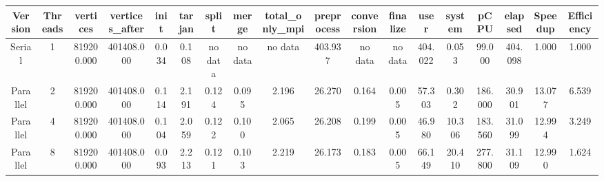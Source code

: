 \begin{tabular}{|c|c|c|c|c|c|c|c|c|c|c|c|c|c|c|c|c|c|}
\toprule
 Version &  Threads &   vertices &  vertices\_after &  init &  tarjan &   split &   merge & total\_only\_mpi &  preprocess & conversion & finalize &    user &  system &    pCPU &  elapsed &  Speedup &  Efficiency \\
\midrule
  Serial &        1 & 819200.000 &      401408.000 & 0.034 &   0.108 & no data & no data &        no data &     403.937 &    no data &  no data & 404.022 &   0.053 &  99.000 &  404.098 &    1.000 &       1.000 \\
Parallel &        2 & 819200.000 &      401408.000 & 0.114 &   2.191 &   0.124 &   0.095 &          2.196 &      26.270 &      0.164 &    0.005 &  57.303 &   0.302 & 186.000 &   30.901 &   13.077 &       6.539 \\
Parallel &        4 & 819200.000 &      401408.000 & 0.104 &   2.059 &   0.122 &   0.100 &          2.065 &      26.208 &      0.199 &    0.005 &  46.980 &  10.306 & 183.560 &   31.099 &   12.994 &       3.249 \\
Parallel &        8 & 819200.000 &      401408.000 & 0.093 &   2.213 &   0.121 &   0.103 &          2.219 &      26.173 &      0.183 &    0.005 &  66.149 &  20.410 & 277.800 &   31.109 &   12.990 &       1.624 \\
\bottomrule
\end{tabular}
